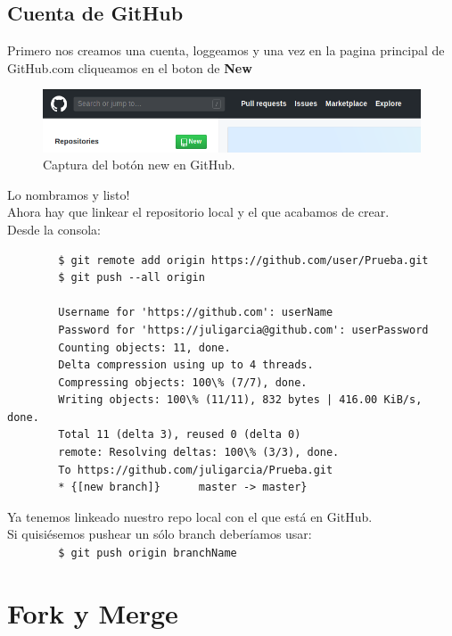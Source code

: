 \documentclass[a4paper, 12pt]{article}
\begin{document}
\subsection{Cuenta de GitHub}

Primero nos creamos una cuenta, loggeamos y una vez en la pagina principal de GitHub.com cliqueamos en el boton de \textbf{New}

\begin{figure}[h!]
\centering
\includegraphics[scale=0.4]{botonNew.png}
\caption{\small Captura del botón new en GitHub.}
\end{figure}

Lo nombramos y listo!\\
Ahora hay que linkear el repositorio local y el que acabamos de crear.\\

Desde la consola:

\begin{verbatim}
        $ git remote add origin https://github.com/user/Prueba.git
        $ git push --all origin
    
        Username for 'https://github.com': userName
        Password for 'https://juligarcia@github.com': userPassword
        Counting objects: 11, done.
        Delta compression using up to 4 threads.
        Compressing objects: 100\% (7/7), done.
        Writing objects: 100\% (11/11), 832 bytes | 416.00 KiB/s, done.
        Total 11 (delta 3), reused 0 (delta 0)
        remote: Resolving deltas: 100\% (3/3), done.
        To https://github.com/juligarcia/Prueba.git
        * {[new branch]}      master -> master}
\end{verbatim}

Ya tenemos linkeado nuestro repo local con el que está en GitHub.\\
Si quisiésemos pushear un sólo branch deberíamos usar:\\

\verb+        $ git push origin branchName+\\

\newpage

\section{Fork y Merge}
\end{document}
